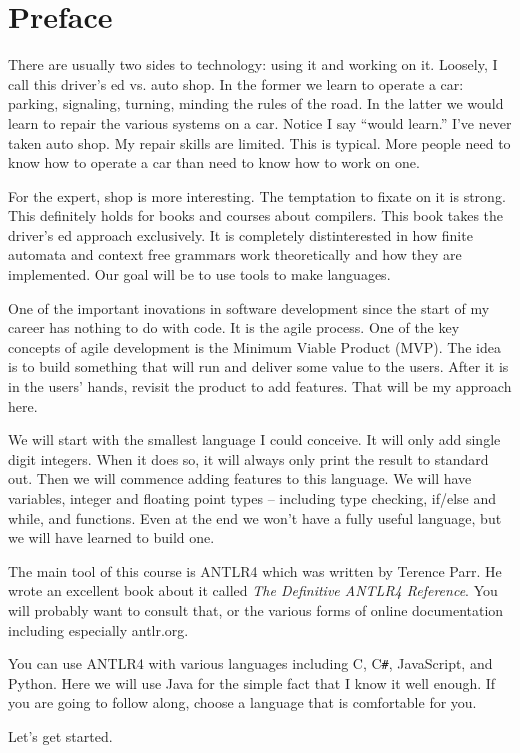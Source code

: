 \chapter*{Preface}

There are usually two sides to technology: using it and working on it.
Loosely, I call this driver's ed vs. auto shop. In the former we learn
to operate a car: parking, signaling, turning, minding the rules of the
road. In the latter we would learn to repair the various systems on
a car. Notice I say ``would learn.'' I've never taken auto shop. My
repair skills are limited. This is typical. More people need to know
how to operate a car than need to know how to work on one.

For the expert, shop is more interesting. The temptation to fixate on it
is strong. This definitely holds for books and courses about compilers.
This book takes the driver's ed approach exclusively. It is completely
distinterested in how finite automata and context free grammars work
theoretically and how they are implemented. Our goal will be to use
tools to make languages.

One of the important inovations in software development since the start
of my career has nothing to do with code. It is the
agile process. One of the key concepts of agile development is the Minimum
Viable Product (MVP). The idea is to build something that will run and
deliver some value to the users. After it is in the users' hands, revisit
the product to add features. That will be my approach here.

We will start with the smallest language I could conceive. It will only add
single digit integers. When it does so, it will always only print the
result to standard out. Then we will commence adding features to this
language. We will have variables, integer and floating point types -- including
type checking, if/else and while, and functions. Even at the end
we won't have a fully useful language, but we will have learned to build one.

The main tool of this course is ANTLR4 which was written by Terence Parr.
He wrote an excellent book about it called
{\it The Definitive ANTLR4 Reference}.
You will probably want to consult that, or the various forms of online
documentation including especially antlr.org.

You can use ANTLR4 with various languages including C, C\verb+#+, JavaScript,
and Python. Here we will use Java for the simple fact that I know
it well enough. If you are going to follow along, choose a language
that is comfortable for you.

Let's get started.
